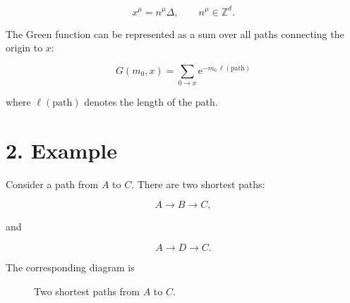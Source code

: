 \documentclass[12pt,a4paper]{article}
\newcommand{\ee}{\mathrm{e}}
\begin{document}
\begin{equation}
    x^\mu=n^\mu\Delta,
    \qquad
    n^\mu\in\mathbb{Z}^d.
\end{equation}

The Green function can be represented as a sum over all paths
connecting the origin to $x$:

\begin{equation}
    \boxed{
    G(m_0,x)
    =
    \sum_{0\to x}
    \ee^{-m_0\,\ell(\text{path})}
    }
\end{equation}

where $\ell(\text{path})$ denotes the length of the path.


\section*{2. Example}

Consider a path from $A$ to $C$. There are two shortest paths:

\begin{equation}
    A\longrightarrow B\longrightarrow C,
\end{equation}

and

\begin{equation}
    A\longrightarrow D\longrightarrow C.
\end{equation}

The corresponding diagram is

\begin{figure}[h!]
\centering


\caption{Two shortest paths from $A$ to $C$.}
\end{figure}
\end{document}
